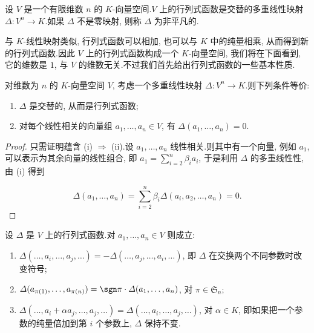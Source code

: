 \begin{definition}[行列式函数]\label{def:4.2.1}
设 $V$ 是一个有限维数 $n$ 的 $K$-向量空间.$V$ 上的行列式函数是交替的多重线性映射 $\varDelta \colon V^n \longrightarrow K$.如果 $\varDelta$ 不是零映射, 则称 $\varDelta$ 为非平凡的.
\end{definition}

与 $K$-线性映射类似, 行列式函数可以相加, 也可以与 $K$ 中的纯量相乘, 从而得到新的行列式函数.因此 $V$ 上的行列式函数构成一个 $K$-向量空间, 我们将在下面看到, 它的维数是 $1$, 与 $V$ 的维数无关.不过我们首先给出行列式函数的一些基本性质.

\begin{remark}\label{rem:4.2.2}
对维数为 $n$ 的 $K$-向量空间 $V$, 考虑一个多重线性映射 $\varDelta \colon V^n \longrightarrow K$.则下列条件等价:
\begin{enumerate}
\item[(i)] $\varDelta$ 是交替的, 从而是行列式函数;
\item[(ii)] 对每个线性相关的向量组 $a_1, \ldots, a_n \in V$, 有 $\varDelta(a_1, \ldots, a_n) = 0$.
\end{enumerate}
\end{remark}

\begin{proof}
只需证明蕴含 (i) $\Longrightarrow$ (ii).设 $a_1, \ldots, a_n$ 线性相关.则其中有一个向量, 例如 $a_1$, 可以表示为其余向量的线性组合, 即 $a_1 = \sum_{i = 2}^{n} \beta_i a_i$, 于是利用 $\varDelta$ 的多重线性性, 由 (i) 得到

\[
\varDelta(a_1, \ldots, a_n) = \sum_{i = 2}^{n} \beta_i \varDelta(a_i, a_2, \ldots, a_n) = 0.
\]
\end{proof}

\begin{remark}\label{rem:4.2.3}
设 $\varDelta$ 是 $V$ 上的行列式函数.对 $a_1, \ldots, a_n \in V$ 则成立:
\begin{enumerate}
\item[(i)] $\varDelta(\ldots, a_i, \ldots, a_j, \ldots) = -\varDelta(\ldots, a_j, \ldots, a_i, \ldots)$, 即 $\varDelta$ 在交换两个不同参数时改变符号;
\item[(ii)] $\varDelta(a_{\pi(1)}, \ldots, a_{\pi(n)}) = \sgn \pi \cdot \varDelta(a_1, \ldots, a_n)$, 对 $\pi \in \mathfrak{S}_n$;
\item[(iii)] $\varDelta(\ldots, a_i + \alpha a_j, \ldots, a_j, \ldots) = \varDelta(\ldots, a_i, \ldots, a_j, \ldots)$, 对 $\alpha \in K$, 即如果把一个参数的纯量倍加到第 $i$ 个参数上, $\varDelta$ 保持不变.
\end{enumerate}
\end{remark}

